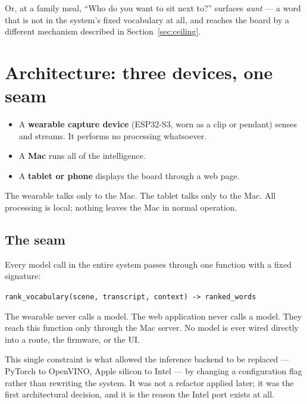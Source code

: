 \documentclass[11pt,a4paper]{article}
\newcommand{\code}[1]{\texttt{\small #1}}
\begin{document}
Or, at a family meal, ``Who do you want to sit next to?'' surfaces \emph{aunt} ---
a word that is not in the system's fixed vocabulary at all, and reaches the board by a
different mechanism described in Section~\ref{sec:ceiling}.

\section{Architecture: three devices, one seam}

\begin{itemize}
  \item A \textbf{wearable capture device} (ESP32-S3, worn as a clip or pendant) senses
  and streams. It performs no processing whatsoever.
  \item A \textbf{Mac} runs all of the intelligence.
  \item A \textbf{tablet or phone} displays the board through a web page.
\end{itemize}

The wearable talks only to the Mac. The tablet talks only to the Mac. All processing is
local; nothing leaves the Mac in normal operation.

\subsection{The seam}

Every model call in the entire system passes through one function with a fixed
signature:

\begin{center}
\code{rank\_vocabulary(scene, transcript, context) -> ranked\_words}
\end{center}

The wearable never calls a model. The web application never calls a model. They reach
this function only through the Mac server. No model is ever wired directly into a route,
the firmware, or the UI.

This single constraint is what allowed the inference backend to be replaced --- PyTorch
to OpenVINO, Apple silicon to Intel --- by changing a configuration flag rather than
rewriting the system. It was not a refactor applied later; it was the first
architectural decision, and it is the reason the Intel port exists at all.

\end{document}
